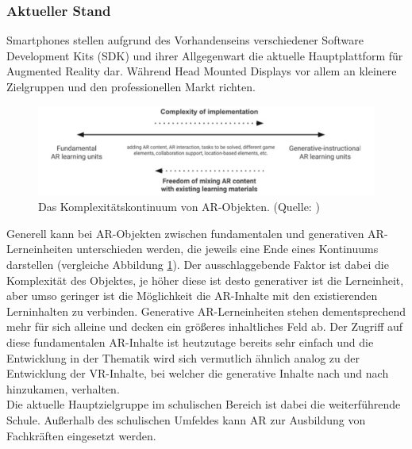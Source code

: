\subsubsection{Aktueller Stand}
Smartphones stellen aufgrund des Vorhandenseins verschiedener Software Development Kits (SDK) und ihrer Allgegenwart die aktuelle Hauptplattform für Augmented Reality dar. Während Head Mounted Displays vor allem an kleinere Zielgruppen und den professionellen Markt richten. \citep[Kapitel 1.2]{geroimenko:ar-in-education}\\
\begin{figure}
\centering
\includegraphics[width=1.0\textwidth]{Abbildungen/ar-object-continuum.png}
\caption[Komplexitätskontinuum von AR-Objekten]{Das Komplexitätskontinuum von AR-Objekten. (Quelle: \cite[S. 9]{geroimenko:ar-in-education})}
\label{fig:komplexitätskontinuum}
\end{figure}
Generell kann bei AR-Objekten zwischen fundamentalen und generativen AR-Lerneinheiten unterschieden werden, die jeweils eine Ende eines Kontinuums darstellen (vergleiche Abbildung \ref{fig:komplexitätskontinuum}).
Der ausschlaggebende Faktor ist dabei die Komplexität des Objektes, je höher diese ist desto generativer ist die Lerneinheit, aber umso geringer ist die Möglichkeit die AR-Inhalte mit den existierenden Lerninhalten zu verbinden. 
Generative AR-Lerneinheiten stehen dementsprechend mehr für sich alleine und decken ein größeres inhaltliches Feld ab.
Der Zugriff auf diese fundamentalen AR-Inhalte ist heutzutage bereits sehr einfach und die Entwicklung in der Thematik wird sich vermutlich ähnlich analog zu der Entwicklung der VR-Inhalte, bei welcher die generative Inhalte nach und nach hinzukamen, verhalten.\citep[Kapitel 1.3]{geroimenko:ar-in-education}\\
Die aktuelle Hauptzielgruppe im schulischen Bereich ist dabei die weiterführende Schule. Außerhalb des schulischen Umfeldes kann AR zur Ausbildung von Fachkräften eingesetzt werden. \citep[Kapitel 1.5]{geroimenko:ar-in-education}

